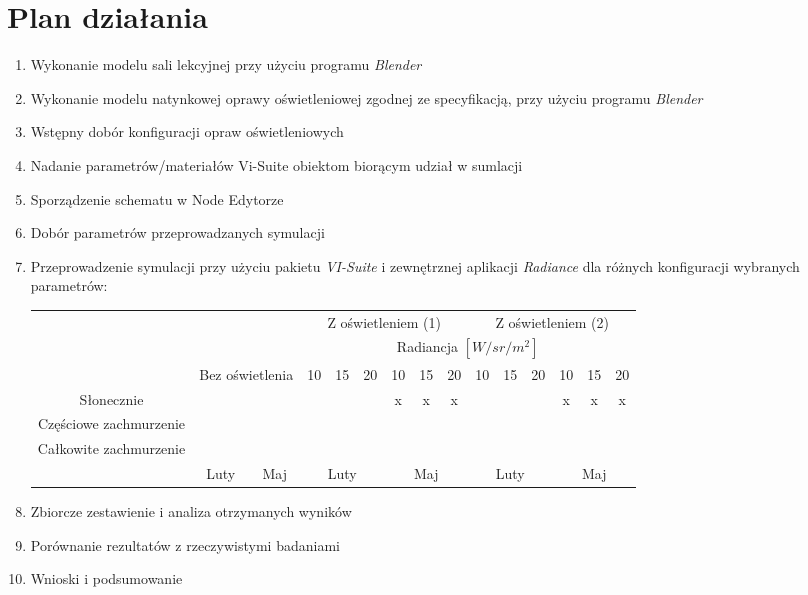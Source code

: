 \documentclass[a4paper,12pt]{article}
\begin{document}
	\section{Plan działania}
	\label{sec:plan_dzialania}
	\begin{enumerate}
		\item Wykonanie modelu sali lekcyjnej przy użyciu programu \emph{Blender} \checkmark
		\item Wykonanie modelu natynkowej oprawy oświetleniowej zgodnej ze specyfikacją, przy użyciu programu \emph{Blender} \checkmark
		\item Wstępny dobór konfiguracji opraw oświetleniowych \checkmark
		\item Nadanie parametrów/materiałów Vi-Suite obiektom biorącym udział w sumlacji \checkmark
		\item Sporządzenie schematu w Node Edytorze \checkmark
		\item Dobór parametrów przeprowadzanych symulacji \checkmark
		\item Przeprowadzenie symulacji przy użyciu pakietu \emph{VI-Suite} i zewnętrznej aplikacji \emph{Radiance} dla różnych konfiguracji wybranych parametrów:
		
		
		\begin{table}[hbp!]
				\begin{tabular}{|c|c|c|c|c|c|c|c|c|c|c|c|c|c|c|}
					\cline{4-15}
					\multicolumn{3}{c|}{}&\multicolumn{6}{c|}{Z oświetleniem (1)} & \multicolumn{6}{c|}{Z oświetleniem (2)}\\ \cline{4-15}
					\multicolumn{3}{c|}{} & \multicolumn{12}{c|}{Radiancja $[W/sr/m^2]$} \\ \cline{2-15}
					\multicolumn{1}{c|}{}&\multicolumn{2}{c|}{Bez oświetlenia}& 10&15&20&10&15&20 & 10&15&20&10&15&20\\ \hline
					Słonecznie & \checkmark & \checkmark & \checkmark & \checkmark &\checkmark&x&x&x&\checkmark&\checkmark&\checkmark&x&x&x\\ \hline
					Częściowe zachmurzenie  & \checkmark & \checkmark & \checkmark & \checkmark &\checkmark& \checkmark & \checkmark & \checkmark &\checkmark&\checkmark&\checkmark&\checkmark&\checkmark&\checkmark  \\ \hline
					Całkowite zachmurzenie  & \checkmark & \checkmark & \checkmark & \checkmark & \checkmark & \checkmark & \checkmark & \checkmark &\checkmark&\checkmark&\checkmark&\checkmark&\checkmark&\checkmark \\ \hline
					\multicolumn{1}{c|}{}& Luty & Maj & \multicolumn{3}{c|}{Luty} & \multicolumn{3}{c|}{Maj} &  \multicolumn{3}{c|}{Luty} & \multicolumn{3}{c|}{Maj}\\ \cline{2-15}
				\end{tabular}
		\end{table}
		
		
		\item Zbiorcze zestawienie i analiza otrzymanych wyników 
		\item Porównanie rezultatów z rzeczywistymi badaniami
		\item Wnioski i podsumowanie
		
	\end{enumerate}
	
\end{document}
